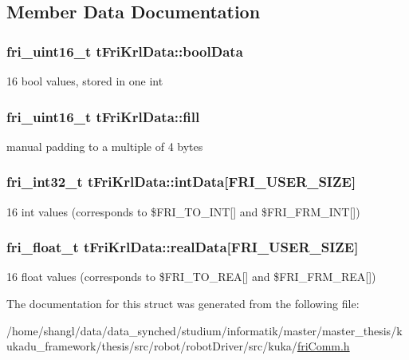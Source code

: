 \subsection{\-Member \-Data \-Documentation}
\hypertarget{structtFriKrlData_a2a8350a056d472aef8ce412e8787a335}{
\subsubsection[{bool\-Data}]{\setlength{\rightskip}{0pt plus 5cm}fri\-\_\-uint16\-\_\-t {\bf t\-Fri\-Krl\-Data\-::bool\-Data}}}\label{structtFriKrlData_a2a8350a056d472aef8ce412e8787a335}
16 bool values, stored in one int \hypertarget{structtFriKrlData_acf2a4fbe1ae60e058931565bb5858574}{
\subsubsection[{fill}]{\setlength{\rightskip}{0pt plus 5cm}fri\-\_\-uint16\-\_\-t {\bf t\-Fri\-Krl\-Data\-::fill}}}\label{structtFriKrlData_acf2a4fbe1ae60e058931565bb5858574}
manual padding to a multiple of 4 bytes \hypertarget{structtFriKrlData_adb5fa3951c21c906e3c932b0a4a7a7ef}{
\subsubsection[{int\-Data}]{\setlength{\rightskip}{0pt plus 5cm}fri\-\_\-int32\-\_\-t {\bf t\-Fri\-Krl\-Data\-::int\-Data}\mbox{[}{\bf \-F\-R\-I\-\_\-\-U\-S\-E\-R\-\_\-\-S\-I\-Z\-E}\mbox{]}}}\label{structtFriKrlData_adb5fa3951c21c906e3c932b0a4a7a7ef}
16 int values (corresponds to \$\-F\-R\-I\-\_\-\-T\-O\-\_\-\-I\-N\-T\mbox{[}\mbox{]} and \$\-F\-R\-I\-\_\-\-F\-R\-M\-\_\-\-I\-N\-T\mbox{[}\mbox{]}) \hypertarget{structtFriKrlData_a37c8e709e61d9aec2f21819eb11273b6}{
\subsubsection[{real\-Data}]{\setlength{\rightskip}{0pt plus 5cm}fri\-\_\-float\-\_\-t {\bf t\-Fri\-Krl\-Data\-::real\-Data}\mbox{[}{\bf \-F\-R\-I\-\_\-\-U\-S\-E\-R\-\_\-\-S\-I\-Z\-E}\mbox{]}}}\label{structtFriKrlData_a37c8e709e61d9aec2f21819eb11273b6}
16 float values (corresponds to \$\-F\-R\-I\-\_\-\-T\-O\-\_\-\-R\-E\-A\mbox{[}\mbox{]} and \$\-F\-R\-I\-\_\-\-F\-R\-M\-\_\-\-R\-E\-A\mbox{[}\mbox{]}) 

\-The documentation for this struct was generated from the following file\-:\begin{DoxyCompactItemize}
\item 
/home/shangl/data/data\-\_\-synched/studium/informatik/master/master\-\_\-thesis/kukadu\-\_\-framework/thesis/src/robot/robot\-Driver/src/kuka/\hyperlink{friComm_8h}{fri\-Comm.\-h}\end{DoxyCompactItemize}
